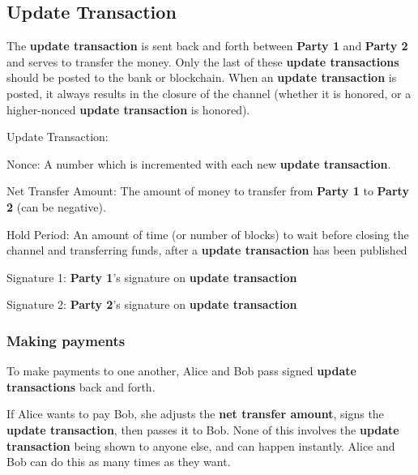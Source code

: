 \documentclass[a4paper]{article}
\newcommand{\bgls}[1]{\textbf{\gls{#1}}}
\newcommand{\bglspl}[1]{\textbf{\glspl{#1}}}
\newenvironment{mydescription}
{\begin{description}
  \setlength{\itemsep}{5pt}
    \setlength{\parskip}{0pt}
    \setlength{\labelsep}{5pt}
}{
\end{description}}
\begin{document}
\subsection{Update Transaction}

The \bgls{update transaction} is sent back and forth between \textbf{Party 1} and \textbf{Party 2} and serves to transfer the money. Only the last of these \bglspl{update transaction} should be posted to the bank or blockchain. When an \bgls{update transaction} is posted, it always results in the closure of the channel (whether it is honored, or a higher-nonced \bgls{update transaction} is honored).

\begin{mdframed}[style=message]
  \begin{mydescription}
    \item[Update Transaction:] \hfill
      \begin{mydescription}
        \item[Nonce:] A number which is incremented with each new \bgls{update transaction}.
        \item[Net Transfer Amount:] The amount of money to transfer from \textbf{Party 1} to \textbf{Party 2} (can be negative).
        \item[Hold Period:] An amount of time (or number of blocks) to wait before closing the channel and transferring funds, after a \bgls{update transaction} has been published
      \end{mydescription}
    \item[Signature 1:] \textbf{Party 1}'s signature on \bgls{update transaction}
    \item[Signature 2:] \textbf{Party 2}'s signature on \bgls{update transaction}
  \end{mydescription}
\end{mdframed}

\subsubsection{Making payments}

To make payments to one another, Alice and Bob pass signed \bglspl{update transaction} back and forth.

If Alice wants to pay Bob, she adjusts the \bgls{net transfer amount}, signs the \bgls{update transaction}, then passes it to Bob. None of this involves the \bgls{update transaction} being shown to anyone else, and can happen instantly. Alice and Bob can do this as many times as they want.
\end{document}
